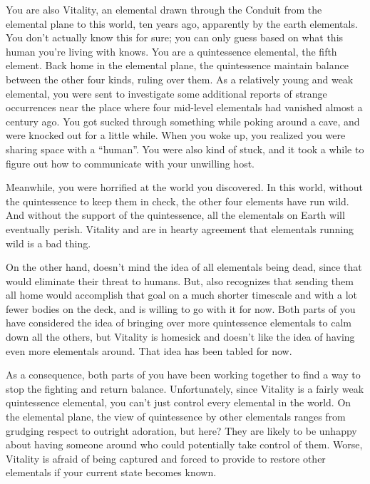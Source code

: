 \documentclass[char]{elementals}
\begin{document}
You are also Vitality, an elemental drawn through the Conduit from the elemental plane to this world, ten years ago, apparently by the earth elementals.  You don't actually know this for sure; you can only guess based on what this human you're living with knows.  You are a quintessence elemental, the fifth element.  Back home in the elemental plane, the quintessence maintain balance between the other four kinds, ruling over them.  As a relatively young and weak elemental, you were sent to investigate some additional reports of strange occurrences near the place where four mid-level elementals had vanished almost a century ago.  You got sucked through something while poking around a cave, and were knocked out for a little while.  When you woke up, you realized you were sharing space with a ``human''.  You were also kind of stuck, and it took a while to figure out how to communicate with your unwilling host.

Meanwhile, you were horrified at the world you discovered.  In this world, without the quintessence to keep them in check, the other four elements have run wild.  And without the support of the quintessence, all the elementals on Earth will eventually perish.  Vitality and \cAvatar{} are in hearty agreement that elementals running wild is a bad thing.

On the other hand, \cAvatar{} doesn't mind the idea of all elementals being dead, since that would eliminate their threat to humans.  But, \cAvatar{} also recognizes that sending them all home would accomplish that goal on a much shorter timescale and with a lot fewer bodies on the deck, and is willing to go with it for now.  Both parts of you have considered the idea of bringing over more quintessence elementals to calm down all the others, but Vitality is homesick and \cAvatar{} doesn't like the idea of having even more elementals around.  That idea has been tabled for now.

As a consequence, both parts of you have been working together to find a way to stop the fighting and return balance.  Unfortunately, since Vitality is a fairly weak quintessence elemental, you can't just control every elemental in the world.  On the elemental plane, the view of quintessence by other elementals ranges from grudging respect to outright adoration, but here?  They are likely to be unhappy about having someone around who could potentially take control of them.  Worse, Vitality is afraid of being captured and forced to provide \iWhite{} to restore other elementals if your current state becomes known.
\end{document}
